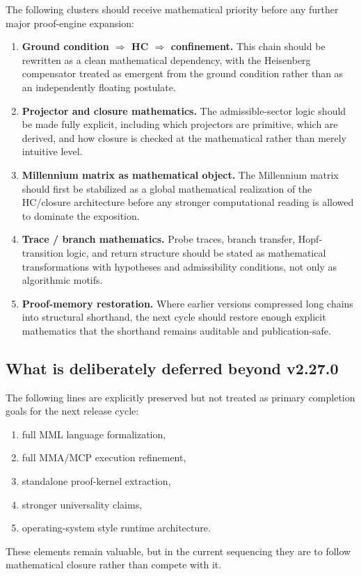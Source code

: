 The following clusters should receive mathematical priority before any further major proof-engine expansion:
\begin{enumerate}[leftmargin=2em,label=\textbf{PC\arabic*:}]
  \item \textbf{Ground condition $\Rightarrow$ HC $\Rightarrow$ confinement.} This chain should be rewritten as a clean mathematical dependency, with the Heisenberg compensator treated as emergent from the ground condition rather than as an independently floating postulate.
  \item \textbf{Projector and closure mathematics.} The admissible-sector logic should be made fully explicit, including which projectors are primitive, which are derived, and how closure is checked at the mathematical rather than merely intuitive level.
  \item \textbf{Millennium matrix as mathematical object.} The Millennium matrix should first be stabilized as a global mathematical realization of the HC/closure architecture before any stronger computational reading is allowed to dominate the exposition.
  \item \textbf{Trace / branch mathematics.} Probe traces, branch transfer, Hopf-transition logic, and return structure should be stated as mathematical transformations with hypotheses and admissibility conditions, not only as algorithmic motifs.
  \item \textbf{Proof-memory restoration.} Where earlier versions compressed long chains into structural shorthand, the next cycle should restore enough explicit mathematics that the shorthand remains auditable and publication-safe.
\end{enumerate}

\subsection*{What is deliberately deferred beyond v2.27.0}

The following lines are explicitly preserved but not treated as primary completion goals for the next release cycle:
\begin{enumerate}[leftmargin=2em,label=\textbf{D\arabic*:}]
  \item full MML language formalization,
  \item full MMA/MCP execution refinement,
  \item standalone proof-kernel extraction,
  \item stronger universality claims,
  \item operating-system style runtime architecture.
\end{enumerate}
These elements remain valuable, but in the current sequencing they are to follow mathematical closure rather than compete with it.

